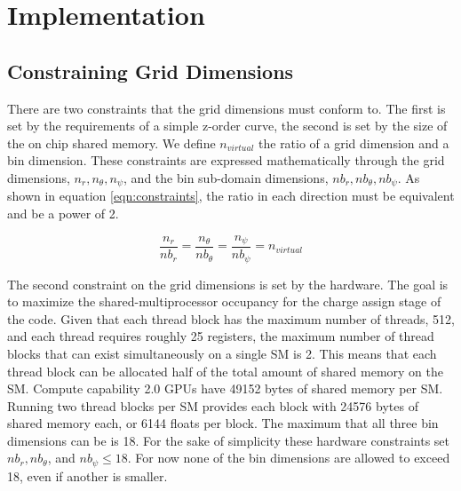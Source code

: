 \chapter{Implementation} 
\label{ch:implementation}
	\section{Constraining Grid Dimensions}
	\label{sec:grid_constraints}
There are two constraints that the grid dimensions must conform to. The first is set by the requirements of a simple z-order curve, the second is set by the size of the on chip shared memory. We define $n_{virtual}$ the ratio of a grid dimension and a bin dimension. These constraints are expressed mathematically through the grid dimensions, $n_r, n_{\theta}, n_{\psi}$, and the bin sub-domain dimensions, $nb_r, nb_{\theta}, nb_{\psi}$. As shown in equation \ref{eqn:constraints}, the ratio in each direction must be equivalent and be a power of 2.
		
\begin{equation}
\frac{n_r}{nb_r} = \frac{n_{\theta}}{nb_{\theta}} = \frac{n_{\psi}}{nb_{\psi}} = n_{virtual}
\label{eqn:constraints}
\end{equation} 



The second constraint on the grid dimensions is set by the hardware. The goal is to maximize the shared-multiprocessor occupancy for the charge assign stage of the code. Given that each thread block has the maximum number of threads, 512, and each thread requires roughly 25 registers, the maximum number of thread blocks that can exist simultaneously on a single SM is 2. This means that each thread block can be allocated half of the total amount of shared memory on the SM. Compute capability 2.0 GPUs have 49152 bytes of shared memory per SM. Running two thread blocks per SM provides each block with 24576 bytes of shared memory each, or 6144 floats per block. The maximum that all three bin dimensions can be is 18. For the sake of simplicity these hardware constraints set $nb_r, nb_{\theta}$, and $nb_{\psi} \le 18$. For now none of the bin dimensions are allowed to exceed 18, even if another is smaller. 

